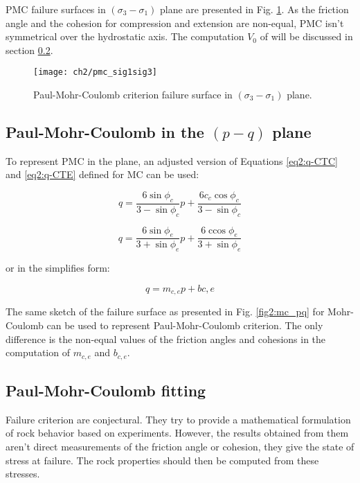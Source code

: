 PMC failure surfaces in $(\sigma_3 -\sigma_1)$ plane are presented in Fig. \ref{fig2:pmc_sig1sig3}. As the friction angle and the cohesion for compression and extension are non-equal, PMC isn’t symmetrical over the hydrostatic axis. The computation $V_0$ of  will be discussed in section \ref{ch2:pmcfit}. 


\begin{figure}[tb]
    \centering
    \texttt{[image: ch2/pmc\_sig1sig3]}
    \caption{Paul-Mohr-Coulomb criterion failure surface in $(\sigma_3 -\sigma_1)$ plane.}
    \label{fig2:pmc_sig1sig3}
\end{figure} 

\subsection{Paul-Mohr-Coulomb in the \texorpdfstring{$(p-q)$}{p-q} plane}

To represent PMC in the  plane, an adjusted version of Equations \ref{eq2:q-CTC} and \ref{eq2:q-CTE} defined for MC can be used:

\begin{equation}\label{eq2:pmc-q-CTC}
    q=\frac{6 \sin \phi_{c}}{3-\sin \phi_{c}} p+\frac{6 c_{c} \cos \phi_{c}}{3-\sin \phi_{c}}
\end{equation}

\begin{equation}\label{eq2:pmc-q-CTE}
    q=\frac{6 \sin \phi_{e}}{3+\sin \phi_{e}} p+\frac{6 \operatorname{ccos} \phi_{e}}{3+\sin \phi_{e}}
\end{equation}

or in the simplifies form:

\begin{equation}
    q = m_{c,e}p+b{c,e}
\end{equation}

The same sketch of the failure surface as presented in Fig. \ref{fig2:mc_pq} for Mohr-Coulomb can be used to represent Paul-Mohr-Coulomb criterion. The only difference is the non-equal values of the friction angles and cohesions in the computation of $m_{c,e}$ and $b_{c,e}$.

\subsection{Paul-Mohr-Coulomb fitting }\label{ch2:pmcfit}

Failure criterion are conjectural. They try to provide a mathematical formulation of rock behavior based on experiments. However, the results obtained from them aren’t direct measurements of the friction angle or cohesion, they give the state of stress at failure. The rock properties should then be computed from these stresses.

